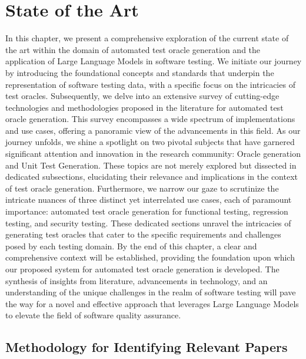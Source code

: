 \chapter{State of the Art}
\label{cha:state_of_the_art}
\vspace{0.4 cm}

In this chapter, we present a comprehensive exploration of the current state of the art within the domain of automated test oracle generation and the application of Large Language Models in software testing. We initiate our journey by introducing the foundational concepts and standards that underpin the representation of software testing data, with a specific focus on the intricacies of test oracles. Subsequently, we delve into an extensive survey of cutting-edge technologies and methodologies proposed in the literature for automated test oracle generation. This survey encompasses a wide spectrum of implementations and use cases, offering a panoramic view of the advancements in this field. As our journey unfolds, we shine a spotlight on two pivotal subjects that have garnered significant attention and innovation in the research community: Oracle generation and Unit Test Generation. These topics are not merely explored but dissected in dedicated subsections, elucidating their relevance and implications in the context of test oracle generation. Furthermore, we narrow our gaze to scrutinize the intricate nuances of three distinct yet interrelated use cases, each of paramount importance: automated test oracle generation for functional testing, regression testing, and security testing. These dedicated sections unravel the intricacies of generating test oracles that cater to the specific requirements and challenges posed by each testing domain. By the end of this chapter, a clear and comprehensive context will be established, providing the foundation upon which our proposed system for automated test oracle generation is developed. The synthesis of insights from literature, advancements in technology, and an understanding of the unique challenges in the realm of software testing will pave the way for a novel and effective approach that leverages Large Language Models to elevate the field of software quality assurance.


\section{Methodology for Identifying Relevant Papers}
\label{sec:papaer_survey_methodology}
\vspace{0.2 cm}

